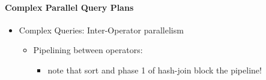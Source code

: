 \paragraph{Complex Parallel Query Plans}

\begin{itemize}
\item Complex Queries: Inter-Operator parallelism
  \begin{itemize}
  \item Pipelining between operators:
    \begin{itemize}
    \item note that sort and phase 1 of hash-join block the pipeline!
    \end{itemize}
  \end{itemize}
\end{itemize}


